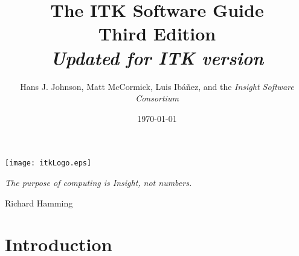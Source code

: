 \documentclass{InsightSoftwareGuide}
\title{The ITK Software Guide\\Third Edition\\ \emph{Updated for ITK version
\ITKVERSIONMAJORMINOR}}
\author{Hans J. Johnson, Matt McCormick, Luis Ib\'{a}\~{n}ez, and the \emph{Insight Software Consortium}}
\date{\today}
\newif\ifitkFullVersion
\begin{document}
\ifitkPrintedVersion

\fi

\maketitle

\frontmatter



%
%
\cleardoublepage

\begin{minipage}[t][10cm][b]{\textwidth}
\center
\texttt{[image: itkLogo.eps]}
\large
\begin{center}
\emph{The purpose of computing is Insight, not numbers.}\\
\end{center}
\hspace{8cm} Richard Hamming
\normalsize
\end{minipage}



%
\pagestyle{plain}
%


\ifitkPrintedVersion

\fi

\ifitkFullVersion


\fi



%
%


%
\pagestyle{normal}
%
\small
\tableofcontents
\listoffigures
\listoftables
\normalsize


%
%

\mainmatter

\part{Introduction}

\ifitkFullVersion



\fi
\end{document}
